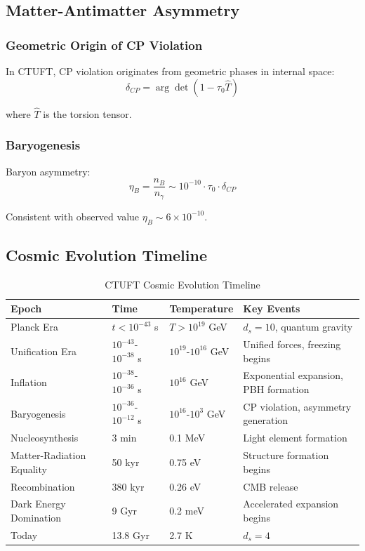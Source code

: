\subsection{Matter-Antimatter Asymmetry}

\subsubsection{Geometric Origin of CP Violation}

In CTUFT, CP violation originates from geometric phases in internal space:
\begin{equation}
    \delta_{CP} = \arg\det(1 - \tau_0 \hat{T})
\end{equation}

where $\hat{T}$ is the torsion tensor.

\subsubsection{Baryogenesis}

Baryon asymmetry:
\begin{equation}
    \eta_B = \frac{n_B}{n_\gamma} \sim 10^{-10} \cdot \tau_0 \cdot \delta_{CP}
\end{equation}

Consistent with observed value $\eta_B \sim 6 \times 10^{-10}$.

\subsection{Cosmic Evolution Timeline}

\begin{table}[htbp]
\centering
\caption{CTUFT Cosmic Evolution Timeline}
\begin{tabular}{llll}
\hline
\textbf{Epoch} & \textbf{Time} & \textbf{Temperature} & \textbf{Key Events} \\
\hline
Planck Era & $t < 10^{-43}$ s & $T > 10^{19}$ GeV & $d_s = 10$, quantum gravity \\
Unification Era & $10^{-43}$-$10^{-38}$ s & $10^{19}$-$10^{16}$ GeV & Unified forces, freezing begins \\
Inflation & $10^{-38}$-$10^{-36}$ s & $10^{16}$ GeV & Exponential expansion, PBH formation \\
Baryogenesis & $10^{-36}$-$10^{-12}$ s & $10^{16}$-$10^3$ GeV & CP violation, asymmetry generation \\
Nucleosynthesis & 3 min & 0.1 MeV & Light element formation \\
Matter-Radiation Equality & 50 kyr & 0.75 eV & Structure formation begins \\
Recombination & 380 kyr & 0.26 eV & CMB release \\
Dark Energy Domination & 9 Gyr & 0.2 meV & Accelerated expansion begins \\
Today & 13.8 Gyr & 2.7 K & $d_s = 4$ \\
\hline
\end{tabular}
\end{table}

